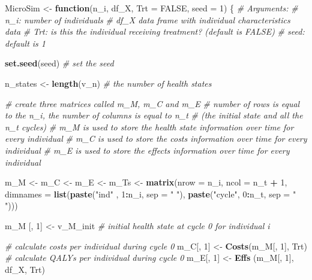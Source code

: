 \documentclass[
]{article}
\newenvironment{Shaded}{\begin{snugshade}}{\end{snugshade}}
\newcommand{\CommentTok}[1]{\textcolor[rgb]{0.56,0.35,0.01}{\textit{#1}}}
\newcommand{\ControlFlowTok}[1]{\textcolor[rgb]{0.13,0.29,0.53}{\textbf{#1}}}
\newcommand{\DataTypeTok}[1]{\textcolor[rgb]{0.13,0.29,0.53}{#1}}
\newcommand{\DecValTok}[1]{\textcolor[rgb]{0.00,0.00,0.81}{#1}}
\newcommand{\KeywordTok}[1]{\textcolor[rgb]{0.13,0.29,0.53}{\textbf{#1}}}
\newcommand{\NormalTok}[1]{#1}
\newcommand{\OperatorTok}[1]{\textcolor[rgb]{0.81,0.36,0.00}{\textbf{#1}}}
\newcommand{\OtherTok}[1]{\textcolor[rgb]{0.56,0.35,0.01}{#1}}
\newcommand{\StringTok}[1]{\textcolor[rgb]{0.31,0.60,0.02}{#1}}
\begin{document}
\begin{Shaded}
\begin{Highlighting}[]
\NormalTok{MicroSim <-}\StringTok{ }\ControlFlowTok{function}\NormalTok{(n_i, df_X, }\DataTypeTok{Trt =} \OtherTok{FALSE}\NormalTok{, }\DataTypeTok{seed =} \DecValTok{1}\NormalTok{) \{}
\CommentTok{# Arguments:  }
  \CommentTok{# n_i:     number of individuals}
    \CommentTok{# df_X     data frame with individual characteristics data }
    \CommentTok{# Trt:     is this the individual receiving treatment? (default is FALSE)}
  \CommentTok{# seed:    default is 1}
  
  \KeywordTok{set.seed}\NormalTok{(seed) }\CommentTok{# set the seed}
  
\NormalTok{  n_states <-}\StringTok{ }\KeywordTok{length}\NormalTok{(v_n) }\CommentTok{# the number of health states}
  
  \CommentTok{# create three matrices called m_M, m_C and m_E}
  \CommentTok{# number of rows is equal to the n_i, the number of columns is equal to n_t  }
  \CommentTok{# (the initial state and all the n_t cycles)}
  \CommentTok{# m_M is used to store the health state information over time for every individual}
  \CommentTok{# m_C is used to store the costs information over time for every individual}
  \CommentTok{# m_E is used to store the effects information over time for every individual}
  
\NormalTok{  m_M <-}\StringTok{ }\NormalTok{m_C <-}\StringTok{ }\NormalTok{m_E <-}\StringTok{ }\NormalTok{m_Ts <-}\StringTok{  }\KeywordTok{matrix}\NormalTok{(}\DataTypeTok{nrow =}\NormalTok{ n_i, }\DataTypeTok{ncol =}\NormalTok{ n_t }\OperatorTok{+}\StringTok{ }\DecValTok{1}\NormalTok{, }
                                     \DataTypeTok{dimnames =} \KeywordTok{list}\NormalTok{(}\KeywordTok{paste}\NormalTok{(}\StringTok{"ind"}\NormalTok{  , }\DecValTok{1}\OperatorTok{:}\NormalTok{n_i, }\DataTypeTok{sep =} \StringTok{" "}\NormalTok{), }
                                                     \KeywordTok{paste}\NormalTok{(}\StringTok{"cycle"}\NormalTok{, }\DecValTok{0}\OperatorTok{:}\NormalTok{n_t, }\DataTypeTok{sep =} \StringTok{" "}\NormalTok{)))  }

\NormalTok{    m_M [, }\DecValTok{1}\NormalTok{] <-}\StringTok{ }\NormalTok{v_M_init    }\CommentTok{# initial health state at cycle 0 for individual i}
  
    \CommentTok{# calculate costs per individual during cycle 0}
\NormalTok{    m_C[, }\DecValTok{1}\NormalTok{]  <-}\StringTok{ }\KeywordTok{Costs}\NormalTok{(m_M[, }\DecValTok{1}\NormalTok{], Trt)     }
    \CommentTok{# calculate QALYs per individual during cycle 0}
\NormalTok{    m_E[, }\DecValTok{1}\NormalTok{]  <-}\StringTok{ }\KeywordTok{Effs}\NormalTok{ (m_M[, }\DecValTok{1}\NormalTok{], df_X, Trt)   }
    

\end{Highlighting}
\end{Shaded}
\end{document}
